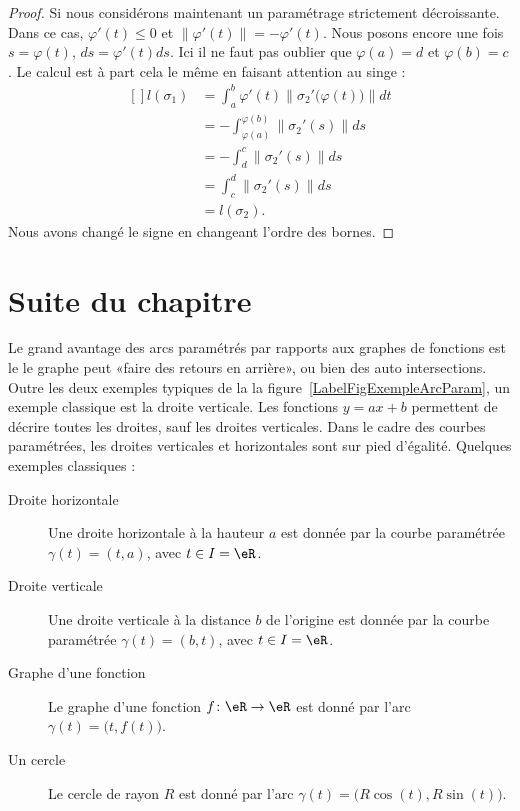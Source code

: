 \begin{proof}
	Si nous considérons maintenant un paramétrage strictement décroissante. Dans ce cas, \( \varphi'(t)\leq 0\) et \( \| \varphi'(t) \|=-\varphi'(t)\). Nous posons encore une fois \( s=\varphi(t)\), \( ds=\varphi'(t)ds\). Ici il ne faut pas oublier que \( \varphi(a)=d\) et \( \varphi(b)=c\). Le calcul est à part cela le même en faisant attention au singe :
	\begin{equation}
		\begin{aligned}[]
			l(\sigma_1) & =\int_a^b\varphi'(t)\| \sigma_2'\big( \varphi(t) \big) \|dt \\
			            & =-\int_{\varphi(a)}^{\varphi(b)}\| \sigma_2'(s) \|ds        \\
			            & =-\int_d^c\| \sigma_2'(s) \|ds                              \\
			            & =\int_c^d\| \sigma_2'(s) \|ds                               \\
			            & =l(\sigma_2).
		\end{aligned}
	\end{equation}
	Nous avons changé le signe en changeant l'ordre des bornes.
\end{proof}

\section{Suite du chapitre}

Le grand avantage des arcs paramétrés par rapports aux graphes de fonctions est le le graphe peut «faire des retours en arrière», ou bien des auto intersections. Outre les deux exemples typiques de la la figure~\ref{LabelFigExempleArcParam}, un exemple classique est la droite verticale. Les fonctions \( y=ax+b\) permettent de décrire toutes les droites, sauf les droites verticales. Dans le cadre des courbes paramétrées, les droites verticales et horizontales sont sur pied d'égalité. Quelques exemples classiques :
\begin{description}
	\item[Droite horizontale] Une droite horizontale à la hauteur \( a\) est donnée par la courbe paramétrée \( \gamma(t)=(t,a)\), avec \( t\in I=\eR\).
	\item[Droite verticale] Une droite verticale à la distance \( b\) de l'origine est donnée par la courbe paramétrée \( \gamma(t)=(b,t)\), avec \( t\in I=\eR\).
		\item[Graphe d'une fonction]\label{PgGrqFnGamma} Le graphe d'une fonction \( f\colon \eR\to \eR\) est donné par l'arc \( \gamma(t)=\big( t,f(t) \big)\).
	\item[Un cercle] Le cercle de rayon \( R\) est donné par l'arc \( \gamma(t)=\big( R\cos(t),R\sin(t) \big)\).
\end{description}

